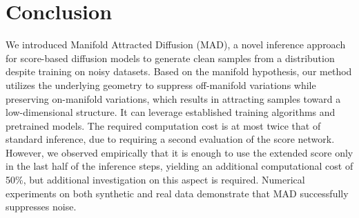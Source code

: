 \documentclass{article}
\theoremstyle{plain}
\theoremstyle{definition}
\theoremstyle{remark}
\begin{document}
\section{Conclusion}

We introduced Manifold Attracted Diffusion (MAD), a novel inference approach for score-based diffusion models to generate clean samples from a distribution despite training on noisy datasets.
Based on the manifold hypothesis, our method utilizes the underlying geometry to suppress off-manifold variations while preserving on-manifold variations, which results in attracting samples toward a low-dimensional structure.
It can leverage established training algorithms and pretrained models.
The required computation cost is at most twice that of standard inference, due to requiring a second evaluation of the score network. However, we observed empirically that it is enough to use the extended score only in the last half of the inference steps, yielding an additional computational cost of 50\%, but additional investigation on this aspect is required.
Numerical experiments on both synthetic and real data demonstrate that MAD successfully suppresses noise.
\end{document}

